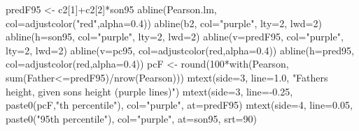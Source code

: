 \documentclass[
  10pt,
  b5paper]{book}
\newenvironment{Shaded}{\begin{snugshade}}{\end{snugshade}}
\newcommand{\AttributeTok}[1]{\textcolor[rgb]{0.77,0.63,0.00}{#1}}
\newcommand{\DecValTok}[1]{\textcolor[rgb]{0.00,0.00,0.81}{#1}}
\newcommand{\FloatTok}[1]{\textcolor[rgb]{0.00,0.00,0.81}{#1}}
\newcommand{\FunctionTok}[1]{\textcolor[rgb]{0.00,0.00,0.00}{#1}}
\newcommand{\NormalTok}[1]{#1}
\newcommand{\OtherTok}[1]{\textcolor[rgb]{0.56,0.35,0.01}{#1}}
\newcommand{\SpecialCharTok}[1]{\textcolor[rgb]{0.00,0.00,0.00}{#1}}
\newcommand{\StringTok}[1]{\textcolor[rgb]{0.31,0.60,0.02}{#1}}
\begin{document}
\begin{Shaded}
\begin{Highlighting}[]
\NormalTok{predF95 }\OtherTok{\textless{}{-}}\NormalTok{ c2[}\DecValTok{1}\NormalTok{]}\SpecialCharTok{+}\NormalTok{c2[}\DecValTok{2}\NormalTok{]}\SpecialCharTok{*}\NormalTok{son95}
\FunctionTok{abline}\NormalTok{(Pearson.lm, }\AttributeTok{col=}\FunctionTok{adjustcolor}\NormalTok{(}\StringTok{"red"}\NormalTok{,}\AttributeTok{alpha=}\FloatTok{0.4}\NormalTok{))}
\FunctionTok{abline}\NormalTok{(b2, }\AttributeTok{col=}\StringTok{"purple"}\NormalTok{, }\AttributeTok{lty=}\DecValTok{2}\NormalTok{, }\AttributeTok{lwd=}\DecValTok{2}\NormalTok{)}
\FunctionTok{abline}\NormalTok{(}\AttributeTok{h=}\NormalTok{son95, }\AttributeTok{col=}\StringTok{"purple"}\NormalTok{, }\AttributeTok{lty=}\DecValTok{2}\NormalTok{, }\AttributeTok{lwd=}\DecValTok{2}\NormalTok{)}
\FunctionTok{abline}\NormalTok{(}\AttributeTok{v=}\NormalTok{predF95, }\AttributeTok{col=}\StringTok{"purple"}\NormalTok{, }\AttributeTok{lty=}\DecValTok{2}\NormalTok{, }\AttributeTok{lwd=}\DecValTok{2}\NormalTok{)}
\FunctionTok{abline}\NormalTok{(}\AttributeTok{v=}\NormalTok{pc95, }\AttributeTok{col=}\FunctionTok{adjustcolor}\NormalTok{(}\StringTok{\textquotesingle{}red\textquotesingle{}}\NormalTok{,}\AttributeTok{alpha=}\FloatTok{0.4}\NormalTok{))}
\FunctionTok{abline}\NormalTok{(}\AttributeTok{h=}\NormalTok{pred95, }\AttributeTok{col=}\FunctionTok{adjustcolor}\NormalTok{(}\StringTok{\textquotesingle{}red\textquotesingle{}}\NormalTok{,}\AttributeTok{alpha=}\FloatTok{0.4}\NormalTok{))}
\NormalTok{pcF }\OtherTok{\textless{}{-}} \FunctionTok{round}\NormalTok{(}\DecValTok{100}\SpecialCharTok{*}\FunctionTok{with}\NormalTok{(Pearson, }\FunctionTok{sum}\NormalTok{(Father}\SpecialCharTok{\textless{}=}\NormalTok{predF95)}\SpecialCharTok{/}\FunctionTok{nrow}\NormalTok{(Pearson)))}
\FunctionTok{mtext}\NormalTok{(}\AttributeTok{side=}\DecValTok{3}\NormalTok{, }\AttributeTok{line=}\FloatTok{1.0}\NormalTok{, }\StringTok{"Father\textquotesingle{}s height, given son\textquotesingle{}s height (purple lines)"}\NormalTok{)}
\FunctionTok{mtext}\NormalTok{(}\AttributeTok{side=}\DecValTok{3}\NormalTok{, }\AttributeTok{line=}\SpecialCharTok{{-}}\FloatTok{0.25}\NormalTok{, }\FunctionTok{paste0}\NormalTok{(pcF,}\StringTok{"th percentile"}\NormalTok{), }\AttributeTok{col=}\StringTok{"purple"}\NormalTok{, }\AttributeTok{at=}\NormalTok{predF95)}
\FunctionTok{mtext}\NormalTok{(}\AttributeTok{side=}\DecValTok{4}\NormalTok{, }\AttributeTok{line=}\FloatTok{0.05}\NormalTok{, }\FunctionTok{paste0}\NormalTok{(}\StringTok{"95th percentile"}\NormalTok{), }\AttributeTok{col=}\StringTok{"purple"}\NormalTok{, }\AttributeTok{at=}\NormalTok{son95, }\AttributeTok{srt=}\DecValTok{90}\NormalTok{)}
\end{Highlighting}
\end{Shaded}
\end{document}
